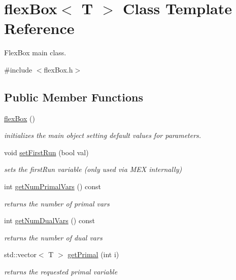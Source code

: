 \hypertarget{classflex_box}{}\section{flex\+Box$<$ T $>$ Class Template Reference}
\label{classflex_box}


Flex\+Box main class.  




{\ttfamily \#include $<$flex\+Box.\+h$>$}

\subsection*{Public Member Functions}
\begin{DoxyCompactItemize}
\item 
\hyperlink{classflex_box_aa325ce1968dc664c0e8e37bdefc25247}{flex\+Box} ()
\begin{DoxyCompactList}\small\item\em initializes the main object setting default values for parameters. \end{DoxyCompactList}\item 
void \hyperlink{classflex_box_a2d02845bc454275d32d237a4034b15b1}{set\+First\+Run} (bool val)
\begin{DoxyCompactList}\small\item\em sets the first\+Run variable (only used via M\+EX internally) \end{DoxyCompactList}\item 
int \hyperlink{classflex_box_a367b7a1fe57fd898ef7ad4159ed14a62}{get\+Num\+Primal\+Vars} () const
\begin{DoxyCompactList}\small\item\em returns the number of primal vars \end{DoxyCompactList}\item 
int \hyperlink{classflex_box_ab6c7512dee891983f60e0f3a63bff8b5}{get\+Num\+Dual\+Vars} () const
\begin{DoxyCompactList}\small\item\em returns the number of dual vars \end{DoxyCompactList}\item 
std\+::vector$<$ T $>$ \hyperlink{classflex_box_ae1c5100eec86603d23d5116ba8d93e9d}{get\+Primal} (int i)
\begin{DoxyCompactList}\small\item\em returns the requested primal variable \end{DoxyCompactList}\item 

\end{DoxyCompactItemize}
